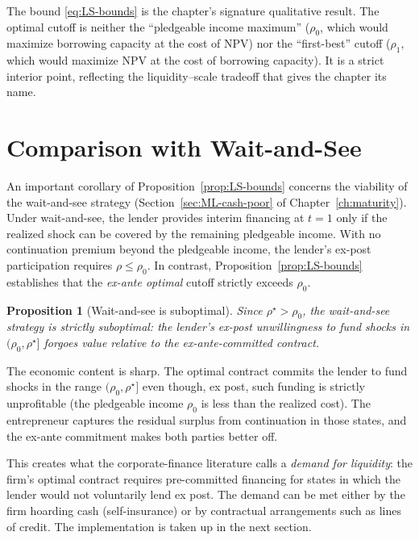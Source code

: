 \documentclass[11pt,a4paper,oneside]{book}
\def\leq{\leqslant}
\theoremstyle{plain}
\newtheorem{proposition}[theorem]{Proposition}
\theoremstyle{definition}
\theoremstyle{remark}
\numberwithin{equation}{chapter}
\begin{document}
The bound \eqref{eq:LS-bounds} is the chapter's signature qualitative result.
The optimal cutoff is neither the ``pledgeable income maximum'' ($\rho_0$, which would maximize borrowing capacity at the cost of NPV) nor the ``first-best'' cutoff ($\rho_1$, which would maximize NPV at the cost of borrowing capacity).
It is a strict interior point, reflecting the liquidity--scale tradeoff that gives the chapter its name.

\section{Comparison with Wait-and-See}
\label{sec:LS-wait-and-see}

An important corollary of Proposition~\ref{prop:LS-bounds} concerns the viability of the wait-and-see strategy (Section~\ref{sec:ML-cash-poor} of Chapter~\ref{ch:maturity}).
Under wait-and-see, the lender provides interim financing at $t=1$ only if the realized shock can be covered by the remaining pledgeable income.
With no continuation premium beyond the pledgeable income, the lender's ex-post participation requires $\rho \leq \rho_0$.
In contrast, Proposition~\ref{prop:LS-bounds} establishes that the \emph{ex-ante optimal} cutoff strictly exceeds $\rho_0$.

\begin{proposition}[Wait-and-see is suboptimal]\label{prop:LS-WS-suboptimal}
Since $\rho^\star > \rho_0$, the wait-and-see strategy is strictly suboptimal: the lender's ex-post unwillingness to fund shocks in $(\rho_0, \rho^\star]$ forgoes value relative to the ex-ante-committed contract.
\end{proposition}

The economic content is sharp.
The optimal contract commits the lender to fund shocks in the range $(\rho_0, \rho^\star]$ even though, ex post, such funding is strictly unprofitable (the pledgeable income $\rho_0$ is less than the realized cost).
The entrepreneur captures the residual surplus from continuation in those states, and the ex-ante commitment makes both parties better off.

This creates what the corporate-finance literature calls a \emph{demand for liquidity}: the firm's optimal contract requires pre-committed financing for states in which the lender would not voluntarily lend ex post.
The demand can be met either by the firm hoarding cash (self-insurance) or by contractual arrangements such as lines of credit.
The implementation is taken up in the next section.
\end{document}

